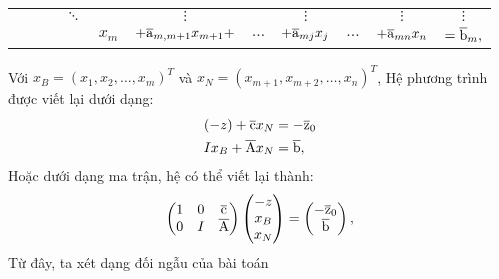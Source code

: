 \documentclass{article}
\begin{document}
\begin{enumerate}
\begin{center}
\begin{tabular} {ccccccccccc}
                                &&& $\ddots$ && $\vdots$ && $\vdots$ && $\vdots$ & $\vdots$ \\
                                &&&& $x_m$ & $+\overline{\rm a}_{m,m+1}x_{m+1}+$ & $\ldots$ & $+ \overline{\rm a}_{mj}x_j$ & $\ldots$ & $+ \overline{\rm a}_{mn}x_n$ & $= \overline{\rm b}_m,$ \\ 
                            \end{tabular}
                        \end{center}
                        Với $x_B=(x_1,x_2,\ldots,x_m)^T$ và $x_N=(x_{m+1},x_{m+2},\ldots,x_n)^T$, Hệ phương trình được viết lại dưới dạng:
                        \begin{equation}
                            \begin{split}
                                (-z) + \overline{\rm c}x_N &= -\overline{\rm z}_0 \\
                                Ix_B + \overline{\rm A}x_N &= \overline{\rm b},
                            \end{split}
                        \end{equation}     
                Hoặc dưới dạng ma trận, hệ có thể viết lại thành:
                \begin{gather}
                    \begin{pmatrix} 
                        1 & 0 & \overline{\rm c} \\
                        0 & I & \overline{\rm A} \\
                    \end{pmatrix}
                    \begin{pmatrix}
                        -z \\
                        x_{B} \\
                        x_{N} \\
                    \end{pmatrix}
                    =
                    \begin{pmatrix}
                        - \overline{\rm z}_0 \\
                        \overline{\rm b}
                    \end{pmatrix}
                    ,
                \end{gather}
                Từ đây, ta xét dạng đối ngẫu của bài toán
                \begin{equation}
                    \begin{split}

\end{split}
\end{equation}
\end{enumerate}
\end{document}
